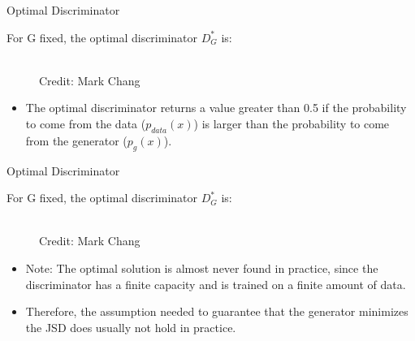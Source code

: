 \begin{frame} {Optimal Discriminator}

  For G fixed, the optimal discriminator $D^*_G$ is:
  \begin{figure}
    \centering
      \tiny{\\Credit: Mark Chang}
  \end{figure}
   \begin{itemize}
  \item  The optimal discriminator returns a value greater than 0.5 if the probability to come from the data ($p_{data}(x)$)  is larger than the probability to come from the generator ($p_g(x)$).
  \end{itemize}
\end{frame}

\begin{frame} {Optimal Discriminator}

  For G fixed, the optimal discriminator $D^*_G$ is:
  \begin{figure}
    \centering
      \tiny{\\Credit: Mark Chang}
  \end{figure}
  \begin{itemize}
  \item  Note: The optimal solution is almost never found in practice, since the discriminator has a finite capacity and is trained on a finite amount of data.
  \item Therefore, the assumption needed to guarantee that the generator minimizes the JSD does usually not hold in practice.
  \end{itemize}
\end{frame}

